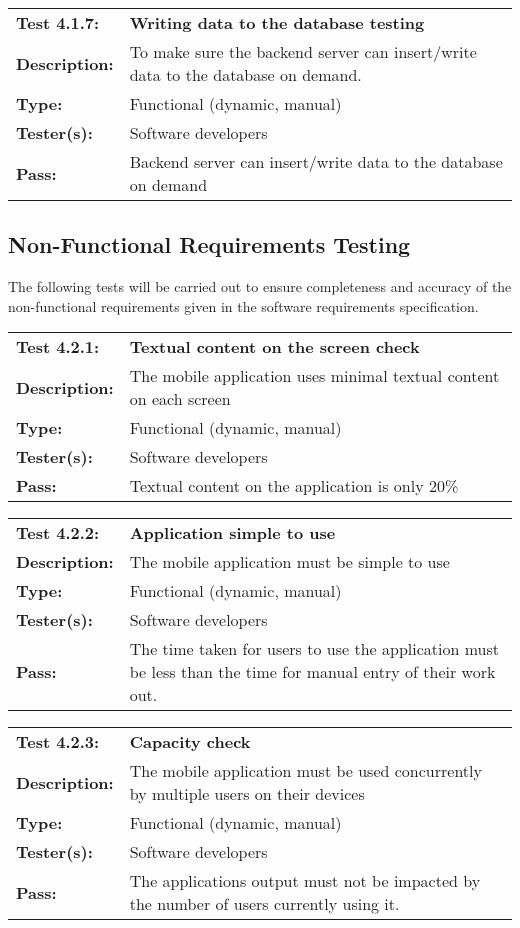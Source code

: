 \documentclass{article}
\newenvironment{testcase}
    {
    \begin{center}
    \begin{mdframed}[
        userdefinedwidth=15.5cm,
        leftmargin=1cm,
        rightmargin=1cm
        ]
    \begin{tabular}{p{2.5cm} p{9cm}}
    }
    {
    \end{tabular}
    \end{mdframed}
    \end{center}
    }
\newcommand{\tctit}[2]{\textbf{#1} & \textbf{#2}}
\newcommand{\tcdesc}{\textbf{Description:}}
\newcommand{\tctype}{\textbf{Type:}}
\newcommand{\testers}{\textbf{Tester(s):}}
\newcommand{\tcpass}{\textbf{Pass:}}
\begin{document}
\endgroup
\begingroup
\begin{testcase}
    \tctit{Test 4.1.7:}{Writing data to the database testing} \\
    \tcdesc & To make sure the backend server can insert/write data to the database on demand.\\
    \tctype & Functional (dynamic, manual)\\
    \testers & Software developers  \\
    \tcpass & Backend server can insert/write data to the database on demand \\
\end{testcase}
\endgroup


\subsection{Non-Functional Requirements Testing}
The following tests will be carried out to ensure completeness and accuracy of the non-functional requirements given in the software requirements specification. 

\begingroup
\begin{testcase}
    \tctit{Test 4.2.1:}{Textual content on the screen check} \\
    \tcdesc & The mobile application uses minimal textual content on each screen\\
    \tctype & Functional (dynamic, manual)\\
    \testers & Software developers \\
    \tcpass & Textual content on the application is only 20\%\\
\end{testcase}
\endgroup

\begingroup
\begin{testcase}
    \tctit{Test 4.2.2:}{Application simple to use} \\
    \tcdesc & The mobile application must be simple to use\\
    \tctype & Functional (dynamic, manual)\\
    \testers & Software developers \\
    \tcpass & The time taken for users to use the application must be less than the time for manual entry of their work out.\\
\end{testcase}
\endgroup

\begingroup
\begin{testcase}
    \tctit{Test 4.2.3:}{Capacity check} \\
    \tcdesc & The mobile application must be used concurrently by multiple users on their devices\\
    \tctype & Functional (dynamic, manual)\\
    \testers & Software developers\\
    \tcpass & The applications output must not be impacted by the number of users currently using it.\\
\end{testcase}
\endgroup
\end{document}
